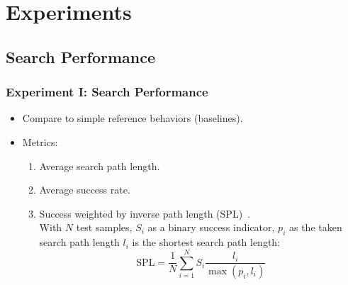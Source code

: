 \section{Experiments}

\subsection{Search Performance}

\begin{frame}
    \frametitle{Experiment I: Search Performance}

    \begin{itemize}
        \item Compare to simple reference behaviors (baselines).
        \item Metrics:
        \begin{enumerate}
            \item Average search path length.
            \item Average success rate.
            \item Success weighted by inverse path length (SPL)~\cite{anderson_evaluation_2018}.\\
            With \(N\) test samples, \(S_i\) as a binary success indicator, \(p_i\) as the taken search path length \(l_i\) is the shortest search path length:
            \begin{equation*}
                \text{SPL} = \frac{1}{N} \sum_{i=1}^N S_i \frac{l_i}{\max(p_i,l_i)}
            \end{equation*}
        \end{enumerate}
    \end{itemize}


\end{frame}

